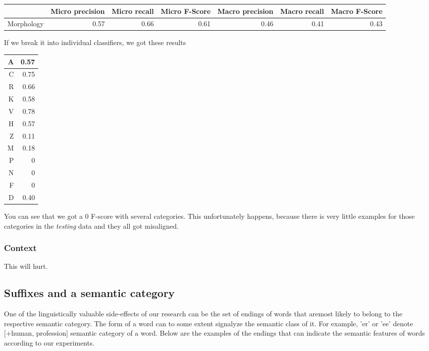 \documentclass[letterpaper]{article}
\begin{document}
\begin{tabular}{|r|r|r|r|r|r|r|}
 \hline
 & \textbf{Micro precision} &  \textbf{Micro recall}  &  \textbf{Micro F-Score} & \textbf{Macro precision} &  \textbf{Macro recall}  &  \textbf{Macro F-Score} \\ \hline
Morphology & 0.57 & 0.66 & 0.61 & 0.46 & 0.41 & 0.43 \\ \hline
\end{tabular}

If we break it into individual classifiers, we got these results


\begin{tabular}{|r|r|}
    A & 0.57 \\ \hline
    C & 0.75 \\ \hline
    R & 0.66 \\ \hline
    K & 0.58 \\ \hline
    V & 0.78 \\ \hline
    H & 0.57 \\ \hline
    Z & 0.11 \\ \hline
    M & 0.18 \\ \hline
    P & 0 \\ \hline
    N & 0 \\ \hline
    F & 0 \\ \hline
    D & 0.40 \\ \hline

\end{tabular}

You can see that we got a 0 F-score with several categories. This unfortunately happens, because there is very little examples for those categories in the \emph{testing} data and they all got misaligned.

\subsubsection{Context}
This will hurt.



\subsection{Suffixes and a semantic category}
One of the linguistically valuable side-effects of our research can be 
the set of endings of words that aremost likely to belong to the
respective semantic category.
The form of a word can to some extent signalyze the semantic class of it. 
For example, 'er' or 'ee' denote [+human, profession] semantic category of a word.
Below are the examples of the endings that
can indicate the semantic features of words according to our experiments.
\end{document}
